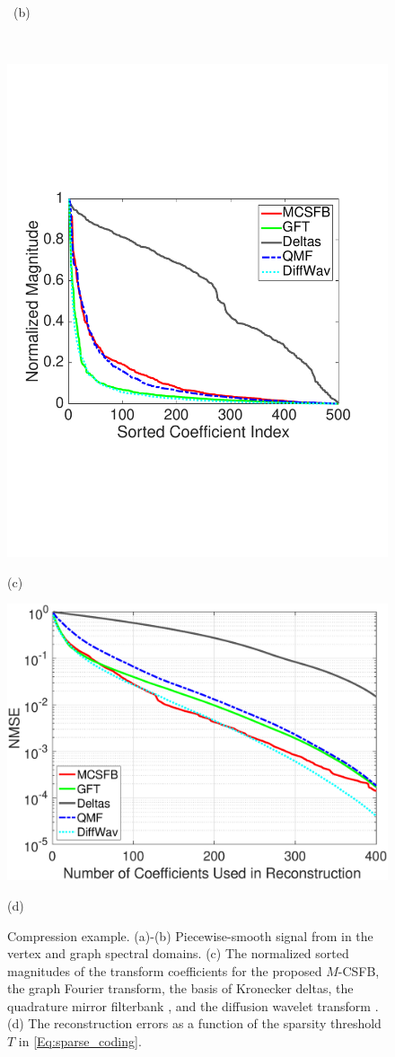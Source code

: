 \documentclass[journal, 10pt]{IEEEtran}
\begin{document}
\begin{figure}[tbh]
\begin{minipage}[m]{0.48\linewidth}
\centerline{~\small{(b)}}
\end{minipage} \\
\vspace{.07in}
\begin{minipage}[m]{0.48\linewidth}
\centerline{\includegraphics[width=.76\linewidth]{fig_comp_coeff2}}
\centerline{\small{(c)}}
\end{minipage}
\begin{minipage}[m]{0.48\linewidth}
\centerline{\includegraphics[width=.82\linewidth]{fig_comp_error2}}
\centerline{\small{(d)}}
\end{minipage}
\caption{Compression example. (a)-(b) Piecewise-smooth signal from \cite[Fig. 11]{shuman_TSP_multiscale} in the vertex and graph spectral domains. (c) The normalized sorted magnitudes of the transform coefficients for the proposed $M$-CSFB, %
the graph Fourier transform, the basis of Kronecker deltas, the quadrature mirror filterbank \cite{narang2012perfect}, and the diffusion wavelet transform \cite{coifman2006diffusion}. (d) The reconstruction errors as a function of the sparsity threshold $T$ in \eqref{Eq:sparse_coding}.\vspace{-.25in}} \label{Fig:comp}
\end{figure}
\end{document}
